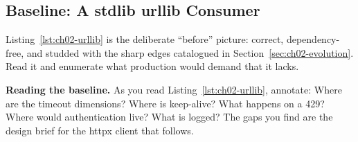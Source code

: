 \subsection{Baseline: A stdlib urllib Consumer}
\label{sec:ch02-urllib}

Listing~\ref{lst:ch02-urllib} is the deliberate ``before'' picture: correct,
dependency-free, and studded with the sharp edges catalogued in
Section~\ref{sec:ch02-evolution}. Read it and enumerate what production would
demand that it lacks.

\begin{examplebox}
\textbf{Reading the baseline.} As you read Listing~\ref{lst:ch02-urllib},
annotate: Where are the timeout dimensions? Where is keep-alive? What happens
on a 429? Where would authentication live? What is logged? The gaps you find
are the design brief for the httpx client that follows.
\end{examplebox}

